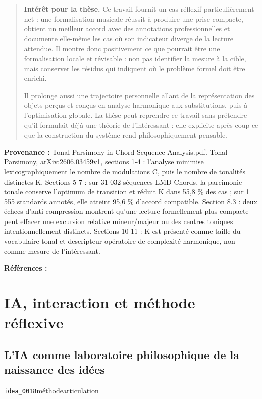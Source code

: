 \documentclass[10pt,a4paper]{article}
\begin{document}
\begin{quote}
\textbf{Intérêt pour la thèse.} Ce travail fournit un cas réflexif particulièrement net : une formalisation musicale réussit à produire une prise compacte, obtient un meilleur accord avec des annotations professionnelles et documente elle-même les cas où son indicateur diverge de la lecture attendue. Il montre donc positivement ce que pourrait être une formalisation locale et révisable : non pas identifier la mesure à la cible, mais conserver les résidus qui indiquent où le problème formel doit être enrichi.

Il prolonge aussi une trajectoire personnelle allant de la représentation des objets perçus et conçus en analyse harmonique aux substitutions, puis à l'optimisation globale. La thèse peut reprendre ce travail sans prétendre qu'il formulait déjà une théorie de l'intéressant : elle explicite après coup ce que la construction du système rend philosophiquement pensable.
\end{quote}
{\footnotesize\color{metadata}\textbf{Provenance :} Tonal Parsimony in Chord Sequence Analysis.pdf. Tonal Parsimony, arXiv:2606.03459v1, sections 1-4 : l'analyse minimise lexicographiquement le nombre de modulations C, puis le nombre de tonalités distinctes K. Sections 5-7 : sur 31 032 séquences LMD Chords, la parcimonie tonale conserve l'optimum de transition et réduit K dans 55,8 \% des cas ; sur 1 555 standards annotés, elle atteint 95,6 \% d'accord compatible. Section 8.3 : deux échecs d'anti-compression montrent qu'une lecture formellement plus compacte peut effacer une excursion relative mineur/majeur ou des centres toniques intentionnellement distincts. Sections 10-11 : K est présenté comme taille du vocabulaire tonal et descripteur opératoire de complexité harmonique, non comme mesure de l'intéressant.\par}
{\footnotesize\color{metadata}\textbf{Références :} \parencite{pachet2026tonalparsimony}\par}

\section{IA, interaction et méthode réflexive}

\subsection{L'IA comme laboratoire philosophique de la naissance des idées}
{\small\color{metadata} \texttt{idea\_0018}\quad\textbullet\quad méthode\quad\textbullet\quad articulation\par}
\end{document}
